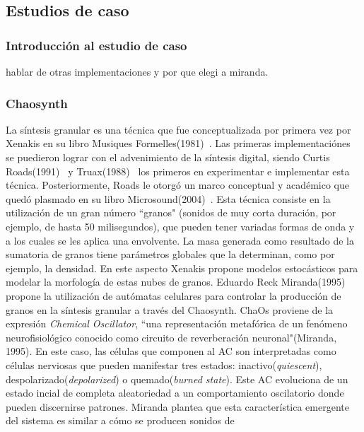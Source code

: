 \documentclass[16pt,spanish]{article}
\begin{document}
\subsection{Estudios de caso}

\subsubsection{Introducción al estudio de caso}

hablar de otras implementaciones y por que elegi a miranda.

\subsubsection{Chaosynth}

La síntesis granular es una técnica que fue
conceptualizada por primera vez por Xenakis en su libro Musiques
Formelles(1981)~\cite{xenakis1981musiques}. Las primeras implementaciónes se
puedieron lograr con el advenimiento de la síntesis digital, siendo Curtis
Roads(1991)~\cite{roads1991asynchronous} y Truax(1988)~\cite{truax1988real} los
primeros en experimentar e implementar esta técnica. Posteriormente, Roads le
otorgó un marco conceptual y académico que quedó plasmado en su libro
Microsound(2004)~\cite{roads2004microsound}. Esta técnica consiste en la
utilización de un gran número ``granos" (sonidos de muy corta duración, por
ejemplo, de hasta 50 milisegundos), que pueden tener variadas formas de onda y
a los cuales se les aplica una envolvente. La masa generada como resultado de
la sumatoria de granos tiene parámetros globales que la determinan, como por
ejemplo, la densidad. En este aspecto Xenakis propone modelos estocásticos para
modelar la morfología de estas nubes de granos. Eduardo Reck
Miranda(1995)~\cite{miranda1995granular} propone la utilización de autómatas
celulares para controlar la producción de granos en la síntesis granular a
través del Chaosynth. ChaOs proviene de la expresión \textit{Chemical
Oscillator}, ``una representación metafórica de un fenómeno neurofisiológico
conocido como circuito de reverberación neuronal"(Miranda, 1995). En este caso,
las células que componen al AC son interpretadas como células nerviosas que
pueden manifestar tres estados: inactivo(\textit{quiescent}),
despolarizado(\textit{depolarized}) o quemado(\textit{burned state}). Este AC
evoluciona de un estado incial de completa aleatoriedad a un comportamiento
oscilatorio donde pueden discernirse patrones. Miranda plantea que esta
característica emergente del sistema es similar a cómo se producen sonidos de
\end{document}

